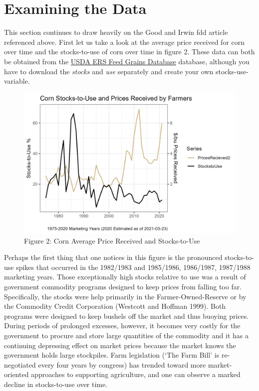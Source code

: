 \documentclass[
  letterpaper,
  DIV=11,
  numbers=noendperiod]{scrreprt}
\begin{document}
\section{Examining the Data}\label{examining-the-data}

This section continues to draw heavily on the Good and Irwin fdd article
referenced above. First let us take a look at the average price received
for corn over time and the stocks-to-use of corn over time in figure 2.
These data can both be obtained from the
\href{http://www.ers.usda.gov/data-products/feed-grains-database.aspx}{USDA
ERS Feed Grains Database} database, although you have to download the
\emph{stocks} and \emph{use} separately and create your own
stocks-use-variable.

\begin{figure}[H]

{\centering \includegraphics{assets/EndingStocksand-StocksUsePrices.png}

}

\caption{Figure 2: Corn Average Price Received and Stocks-to-Use}

\end{figure}%

Perhaps the first thing that one notices in this figure is the
pronounced stocks-to-use spikes that occurred in the 1982/1983 and
1985/1986, 1986/1987, 1987/1988 marketing years. Those exceptionally
high stocks relative to use was a result of government commodity
programs designed to keep prices from falling too far. Specifically, the
stocks were help primarily in the Farmer-Owned-Reserve or by the
Commodity Credit Corporation (Westcott and Hoffman 1999). Both programs
were designed to keep bushels off the market and thus buoying prices.
During periods of prolonged excesses, however, it becomes very costly
for the government to procure and store large quantities of the
commodity and it has a continuing depressing effect on market prices
because the market knows the government holds large stockpiles. Farm
legislation (`The Farm Bill' is re-negotiated every four years by
congress) has trended toward more market-oriented approaches to
supporting agriculture, and one can observe a marked decline in
stocks-to-use over time.
\end{document}
